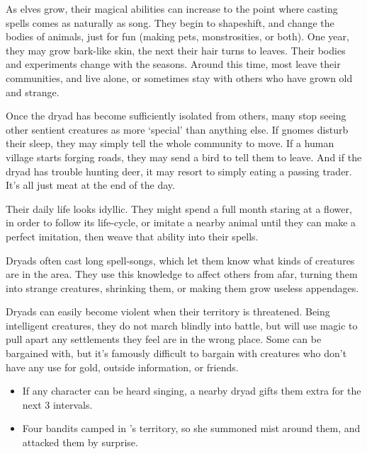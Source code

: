 \begin{multicols}{2}

\noindent
As elves grow, their magical abilities can increase to the point where casting spells comes as naturally as song.
They begin to shapeshift, and change the bodies of animals, just for fun (making pets, monstrosities, or both).
One year, they may grow bark-like skin, the next their hair turns to leaves.
Their bodies and experiments change with the seasons.
Around this time, most leave their communities, and live alone, or sometimes stay with others who have grown old and strange.

Once the \gls{dryad} has become sufficiently isolated from others, many stop seeing other sentient creatures as more `special' than anything else.
If gnomes disturb their sleep, they may simply tell the whole community to move.
If a human \gls{village} starts forging roads, they may send a bird to tell them to leave.
And if the \gls{dryad} has trouble hunting deer, it may resort to simply eating a passing trader.
It's all just meat at the end of the day.

Their daily life looks idyllic.
They might spend a full month staring at a flower, in order to follow its life-cycle, or imitate a nearby animal until they can make a perfect imitation, then weave that ability into their spells.

Dryads often cast long spell-songs, which let them know what kinds of creatures are in the area.
They use this knowledge to affect others from afar, turning them into strange creatures, shrinking them, or making them grow useless appendages.

Dryads can easily become violent when their territory is threatened.
Being intelligent creatures, they do not march blindly into battle, but will use magic to pull apart any settlements they feel are in the wrong place.
Some can be bargained with, but it's famously difficult to bargain with creatures who don't have any use for gold, outside information, or friends.

\dryad

\showStdSpells

\showEnc[El]

\begin{itemize}

  \item
  If any character can be heard singing, a nearby \gls{dryad} gifts them extra  for the next 3 \glspl{interval}.
  \item
  Four bandits camped in 's territory, so she summoned mist around them, and attacked them by surprise.


\end{itemize}
\end{multicols}
